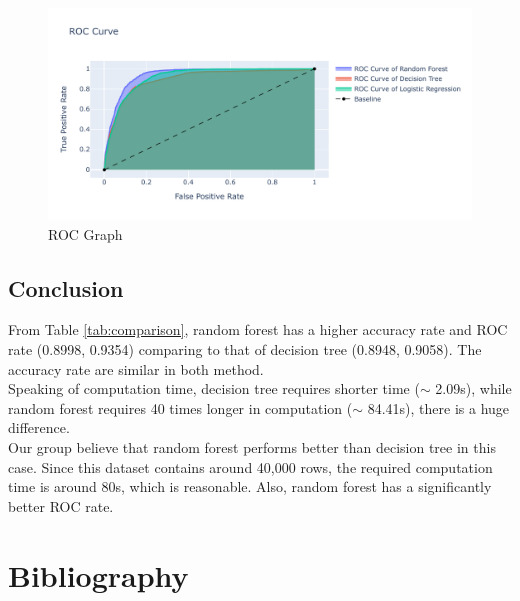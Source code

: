 \documentclass[11pt,a4paper]{article}
\begin{document}

    
    \begin{figure}[H]
        \centering
        \includegraphics[width = \textwidth]{plot/classification/roc.pdf}
        \caption{ROC Graph}
        \label{fig:roc}
    \end{figure}

    
    
    \subsection{Conclusion}
    From Table \ref{tab:comparison}, random forest has a higher accuracy rate and ROC rate (0.8998, 0.9354) comparing to that of decision tree (0.8948, 0.9058). The accuracy rate are similar in both method. \\
    Speaking of computation time, decision tree requires shorter time ($\sim$ 2.09s), while random forest requires 40 times longer in computation ($\sim$ 84.41s), there is a huge difference. \\
    Our group believe that random forest performs better than decision tree in this case. Since this dataset contains around 40,000 rows, the required computation time is around 80s, which is reasonable. Also, random forest has a significantly better ROC rate.
    
    
    \newpage
    \section{Bibliography}
    
\end{document}
